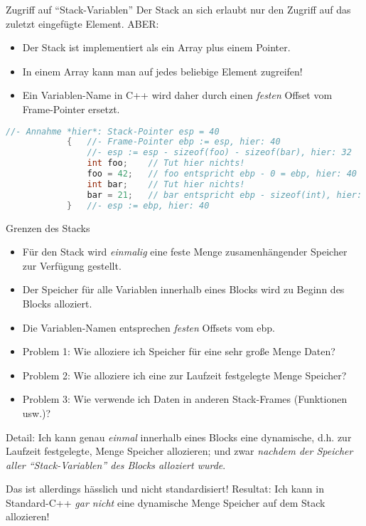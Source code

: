 \begin{frame}[fragile]{Zugriff auf \enquote{Stack-Variablen}}
	Der Stack an sich erlaubt nur den Zugriff auf das zuletzt eingefügte Element. ABER:
	\pause
	\begin{itemize}
		\item Der Stack ist implementiert als ein Array plus einem Pointer.
		\item In einem Array kann man auf jedes beliebige Element zugreifen!
		\item Ein Variablen-Name in C++ wird daher durch einen \emph{festen} Offset vom Frame-Pointer ersetzt.
	\end{itemize}
	
	\pause
	
	\footnotesize
	\begin{block}{}
		\begin{lstlisting}[language=C++]
			//- Annahme *hier*: Stack-Pointer esp = 40
			{   //- Frame-Pointer ebp := esp, hier: 40
			    //- esp := esp - sizeof(foo) - sizeof(bar), hier: 32
			    int foo;    // Tut hier nichts!
			    foo = 42;   // foo entspricht ebp - 0 = ebp, hier: 40
			    int bar;    // Tut hier nichts!
			    bar = 21;   // bar entspricht ebp - sizeof(int), hier: 36
			}   //- esp := ebp, hier: 40
		\end{lstlisting}
	\end{block}
\end{frame}

\begin{frame}[fragile]{Grenzen des Stacks}
	\begin{itemize}
		\item Für den Stack wird \emph{einmalig} eine feste Menge zusamenhängender Speicher zur Verfügung gestellt.
		\item Der Speicher für alle Variablen innerhalb eines Blocks wird zu Beginn des Blocks alloziert.
		\item Die Variablen-Namen entsprechen \emph{festen} Offsets vom ebp.
	\end{itemize}
	
	\pause
	
	\begin{itemize}
		\item Problem 1: Wie alloziere ich Speicher für eine sehr große Menge Daten?
		\item Problem 2: Wie alloziere ich eine zur Laufzeit festgelegte Menge Speicher?
		\item Problem 3: Wie verwende ich Daten in anderen Stack-Frames (Funktionen usw.)?
	\end{itemize}
	
	\pause
	
	\tiny
	Detail:
	Ich kann genau \emph{einmal} innerhalb eines Blocks eine dynamische, d.h. zur Laufzeit festgelegte, Menge Speicher allozieren;
	und zwar \emph{nachdem der Speicher aller \enquote{Stack-Variablen} des Blocks alloziert wurde}.
	
	Das ist allerdings hässlich und nicht standardisiert!
	Resultat: Ich kann in Standard-C++ \emph{gar nicht} eine dynamische Menge Speicher auf dem Stack allozieren!
\end{frame}

